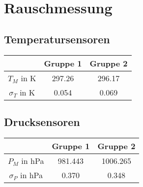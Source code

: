 \documentclass[11pt]{beamer}
\author{Gruppe C14 \\ Julián Häck, Martin Koytek, Lars Wenning, Erik Zimmermann}
\begin{document}
\section{Rauschmessung}
\subsection{Temperatursensoren}
\begin{frame}
\begin{figure}[H]
\end{figure}
\begin{table}[H]\centering
\begin{tabular}{c|c|c}
 & Gruppe 1 & Gruppe 2 \\ 
\hline 
$T_M$ in K & 297.26 & 296.17 \\ 
$\sigma_T$ in K & 0.054 & 0.069 \\  
\end{tabular} 
\end{table}
\end{frame}



\subsection{Drucksensoren}
\begin{frame}
\begin{figure}[H]
\end{figure}

\begin{table}[H]\centering
\begin{tabular}{c|c|c}
 & Gruppe 1 & Gruppe 2 \\ 
\hline 
$P_M$ in hPa & 981.443 & 1006.265 \\ 
$\sigma_P$ in hPa & 0.370 & 0.348 \\  
\end{tabular} 
\end{table}
\end{frame}
\end{document}
